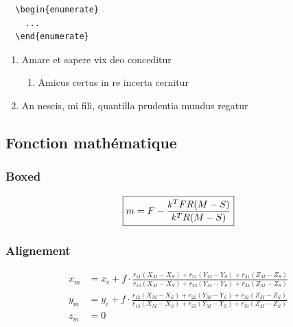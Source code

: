 \begin{verbatim}
  \begin{enumerate}
    ...
  \end{enumerate}
\end{verbatim}
\begin{enumerate}
  \raggedright %
  \item Amare et sapere vix deo conceditur
  \begin{enumerate}
      \item Amicus certus in re incerta cernitur
    \end{enumerate} 
  \item An nescis, mi fili, quantilla prudentia mundus regatur
\end{enumerate}




\subsection{Fonction mathématique}

\subsubsection{Boxed}
\begin{equation}
    \boxed{m = F - \frac{k^TFR(M-S)}{k^T R(M-S)}}\\
    \label{colin}
\end{equation}
\subsubsection{Alignement}
\begin{align*}
    x_m&=x_c+f\cdot\frac{r_{11}(X_M-X_S)+r_{21}(Y_M-Y_S)+r_{31}(Z_M-Z_S)}{r_{13}(X_M-X_S)+r_{23}(Y_M-Y_S)+r_{33}(Z_M-Z_S)}\\
    y_m&=y_c+f\cdot\frac{r_{12}(X_M-X_S)+r_{22}(Y_M-Y_S)+r_{32}(Z_M-Z_S)}{r_{13}(X_M-X_S)+r_{23}(Y_M-Y_S)+r_{33}(Z_M-Z_S)}\\
    z_m&=0
\end{align*}
